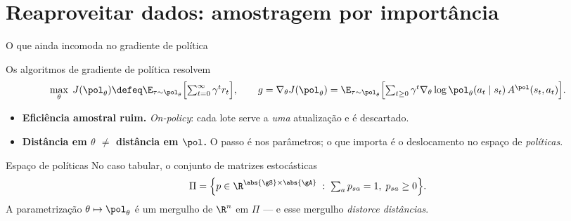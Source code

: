 \documentclass[aspectratio=169, 10pt]{beamer}
\newcommand{\thv}{\theta}
\newcommand{\polth}{\pol_{\thv}}
\newcommand{\gth}{\nabla_{\thv}}
\newcommand{\traj}{\tau}
\newcommand{\Advpi}{A^{\pol}}
\begin{document}
\section{Reaproveitar dados: amostragem por importância}

\begin{frame}{O que ainda incomoda no gradiente de política}

  Os algoritmos de gradiente de política resolvem
  \[
    \max_{\thv} \; J(\polth) \defeq \E_{\traj \sim \polth}
      \Bigl[\textstyle\sum_{t=0}^{\infty} \gamma^t r_t\Bigr],
    \qquad
    g = \gth J(\polth) = \E_{\traj\sim\polth}
      \Bigl[\textstyle\sum_{t\ge 0}\gamma^t \gth \log \polth(a_t\mid s_t)\,\Advpi(s_t,a_t)\Bigr].
  \]

  \begin{itemize}
    \item \textbf{Eficiência amostral ruim.} \emph{On-policy}: cada lote serve a
      \emph{uma} atualização e é descartado.
    \item \textbf{Distância em $\thv$ $\neq$ distância em $\pol$.} O passo é nos
      parâmetros; o que importa é o deslocamento no espaço de \emph{políticas}.
  \end{itemize}

  \begin{defbox}{Espaço de políticas}
    No caso tabular, o conjunto de matrizes estocásticas
    \[
      \Pi = \Bigl\{ p \in \R^{\abs{\gS}\times\abs{\gA}} \;:\;
        \textstyle\sum_a p_{sa} = 1,\; p_{sa}\ge 0 \Bigr\}.
    \]
    A parametrização $\thv \mapsto \polth$ é um mergulho de $\R^n$ em $\Pi$ --- e
    esse mergulho \emph{distorce distâncias}.
  \end{defbox}
\end{frame}
\end{document}
